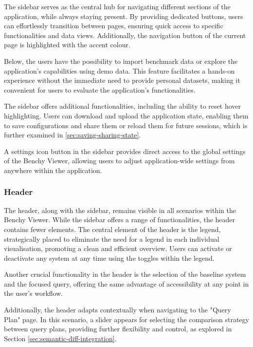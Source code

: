 The sidebar serves as the central hub for navigating different sections of the application, while always staying present. By providing dedicated buttons, users can effortlessly transition between pages, ensuring quick access to specific functionalities and data views. Additionally, the navigation button of the current page is highlighted with the accent colour.

Below, the users have the possibility to import benchmark data or explore the application's capabilities using demo data. This feature facilitates a hands-on experience without the immediate need to provide personal datasets, making it convenient for users to evaluate the application's functionalities.

The sidebar offers additional functionalities, including the ability to reset hover highlighting. Users can download and upload the application state, enabling them to save configurations and share them or reload them for future sessions, which is further examined in \ref{sec:saving-sharing-state}. 

A settings icon button in the sidebar provides direct access to the global settings of the Benchy Viewer, allowing users to adjust application-wide settings from anywhere within the application.



\subsubsection{Header}
The header, along with the sidebar, remains visible in all scenarios within the Benchy Viewer. While the sidebar offers a range of functionalities, the header contains fewer elements. The central element of the header is the legend, strategically placed to eliminate the need for a legend in each individual visualisation, promoting a clean and efficient overview. Users can activate or deactivate any system at any time using the toggles within the legend.

Another crucial functionality in the header is the selection of the baseline system and the focused query, offering the same advantage of accessibility at any point in the user's workflow.

Additionally, the header adapts contextually when navigating to the "Query Plan" page. In this scenario, a slider appears for selecting the comparison strategy between query plans, providing further flexibility and control, as explored in Section \ref{sec:semantic-diff-integration}.



